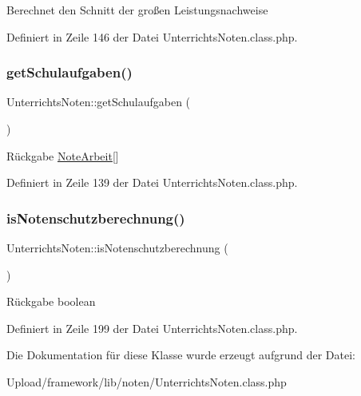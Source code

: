 Berechnet den Schnitt der großen Leistungsnachweise 

Definiert in Zeile 146 der Datei Unterrichts\+Noten.\+class.\+php.

\mbox{\label{class_unterrichts_noten_a949fb5e1e7c703429133c2e0566a8919}} 
\subsubsection{\texorpdfstring{get\+Schulaufgaben()}{getSchulaufgaben()}}
{\footnotesize\ttfamily Unterrichts\+Noten\+::get\+Schulaufgaben (\begin{DoxyParamCaption}{ }\end{DoxyParamCaption})}

\begin{DoxyReturn}{Rückgabe}
\mbox{\hyperlink{class_note_arbeit}{Note\+Arbeit}}\mbox{[}\mbox{]} 
\end{DoxyReturn}


Definiert in Zeile 139 der Datei Unterrichts\+Noten.\+class.\+php.

\mbox{\label{class_unterrichts_noten_a56014dfb5aa657a7bff3f617f03a9884}} 
\subsubsection{\texorpdfstring{is\+Notenschutzberechnung()}{isNotenschutzberechnung()}}
{\footnotesize\ttfamily Unterrichts\+Noten\+::is\+Notenschutzberechnung (\begin{DoxyParamCaption}{ }\end{DoxyParamCaption})}

\begin{DoxyReturn}{Rückgabe}
boolean 
\end{DoxyReturn}


Definiert in Zeile 199 der Datei Unterrichts\+Noten.\+class.\+php.



Die Dokumentation für diese Klasse wurde erzeugt aufgrund der Datei\+:\begin{DoxyCompactItemize}
\item 
Upload/framework/lib/noten/Unterrichts\+Noten.\+class.\+php\end{DoxyCompactItemize}
